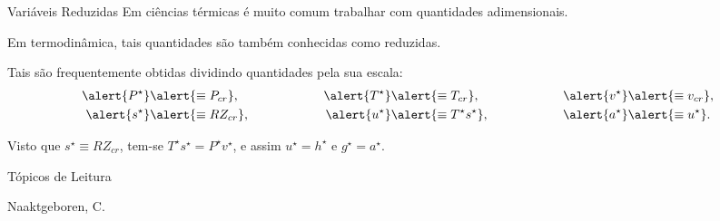     \begin{frame}[allowframebreaks]{Variáveis Reduzidas}
        Em \alert{ciências térmicas} é muito comum trabalhar com quantidades
        \alert{adimensionais}. \vspace*\medskipamount

        Em \alert{termodinâmica}, tais quantidades são também conhecidas como \alert{reduzidas}.
        \vspace*\medskipamount

        Tais são frequentemente obtidas \alert{dividindo} quantidades pela sua \alert{escala}:
        \begin{alignat*}{5}
            \alert{P^\star} &\alert{\equiv P_{cr}},  & \qquad & \qquad & \alert{T^\star} &\alert{\equiv T_{cr}},          & \qquad & \qquad & \alert{v^\star} &\alert{\equiv v_{cr}}, \\
            \alert{s^\star} &\alert{\equiv RZ_{cr}}, & \qquad & \qquad & \alert{u^\star} &\alert{\equiv T^\star s^\star}, & \qquad & \qquad & \alert{a^\star} &\alert{\equiv u^\star}.
        \end{alignat*}

        Visto que \alert{$s^\star \equiv RZ_{cr}$}, tem-se \alert{$T^\star s^\star = P^\star
        v^\star$}, e assim \alert{$u^\star = h^\star$} e \alert{$g^\star = a^\star$}.

    \end{frame}

    \begin{frame}{Tópicos de Leitura}
        \begin{thebibliography}{Naaktgeboren, C., 2018}
                Naaktgeboren, C.
        \end{thebibliography}
    \end{frame}




